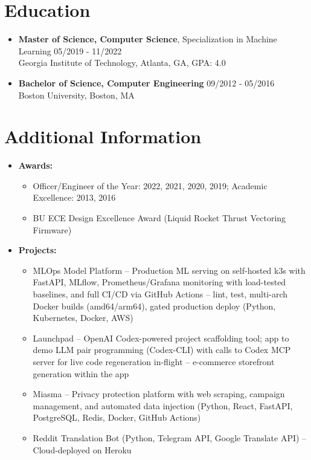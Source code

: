 \documentclass[10pt]{extarticle}
\begin{document}
\section{Education} \begin{itemize}
    \itemsep0.2em
    \item \textbf{Master of Science, Computer Science}, Specialization in Machine Learning \hfill 05/2019 - 11/2022\\Georgia Institute of Technology, Atlanta, GA, GPA: 4.0
    \item \textbf{Bachelor of Science, Computer Engineering} \hfill 09/2012 - 05/2016\\Boston University, Boston, MA  \end{itemize} 


\section{Additional Information} 
\begin{itemize}
    \itemsep0.2em
    \item \textbf{Awards: }
    \vspace{-\topsep} \vspace{0.2em}
    \begin{itemize}
        \itemsep0em
        \item Officer/Engineer of the Year: 2022, 2021, 2020, 2019; Academic Excellence: 2013, 2016
        \item BU ECE Design Excellence Award (Liquid Rocket Thrust Vectoring Firmware)
    \end{itemize}
    \item \textbf{Projects: }
    \vspace{-\topsep} \vspace{0.2em}
    \begin{itemize}
        \itemsep0em
        \item MLOps Model Platform -- Production ML serving on self-hosted k3s with FastAPI, MLflow, Prometheus/Grafana monitoring with load-tested baselines, and full CI/CD via GitHub Actions -- lint, test, multi-arch Docker builds (amd64/arm64), gated production deploy (Python, Kubernetes, Docker, AWS)
        \item Launchpad -- OpenAI Codex-powered project scaffolding tool; app to demo LLM  pair programming (Codex-CLI) with calls to Codex MCP server for live code regeneration in-flight -- e-commerce storefront generation within the app
        \item Miasma -- Privacy protection platform with web scraping, campaign management, and automated data injection (Python, React, FastAPI, PostgreSQL, Redis, Docker, GitHub Actions)
        \item Reddit Translation Bot (Python, Telegram API, Google Translate API) -- Cloud-deployed on Heroku
    \end{itemize} \end{itemize} 

\end{document}
